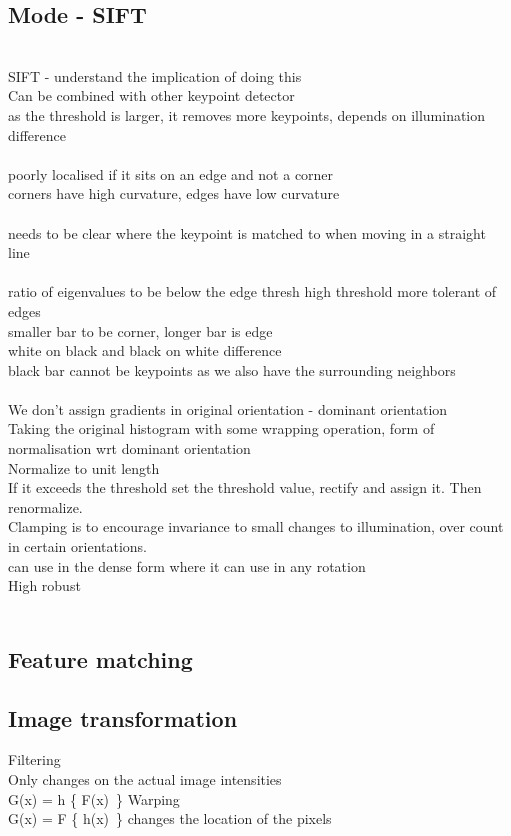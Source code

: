 \documentclass[11pt]{article}
\begin{document}
\subsection*{Mode - SIFT}\\
SIFT - understand the implication of doing this\\
Can be combined with other keypoint detector
\\
as the threshold is larger, it removes more keypoints, depends on illumination difference\\
\\
poorly localised if it sits on an edge and not a corner\\
corners have high curvature, edges have low curvature\\
\\
needs to be clear where the keypoint is matched to when moving in a straight line\\
\\
ratio of eigenvalues to be below the edge thresh
high threshold more tolerant of edges\\
smaller bar to be corner, longer bar is edge\\
white on black and black on white difference\\
black bar cannot be keypoints as we also have the surrounding neighbors\\
\\
We don't assign gradients in original orientation - dominant orientation
\\
Taking the original histogram with some wrapping operation, form of normalisation wrt dominant orientation\\
Normalize to unit length\\
If it exceeds the threshold set the threshold value, rectify and assign it. Then renormalize.\\
Clamping is to encourage invariance to small changes to illumination, over count in certain orientations.
\\
can use in the dense form where it can use in any rotation \\
High robust
\\
\\
\subsection*{Feature matching}
\subsection*{Image transformation}
Filtering\\
Only changes on the actual image intensities\\
G(x) = h \{ F(x)\ \}
Warping\\
G(x) = F \{ h(x)\ \}
changes the location of the pixels
\\\\
\end{document}
